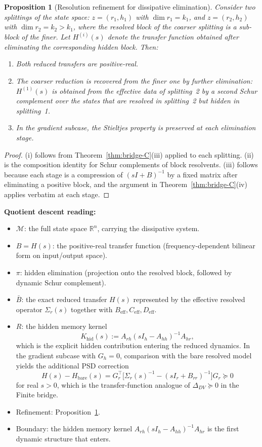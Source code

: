 \documentclass[11pt,a4paper]{article}
\numberwithin{equation}{section}
\newcommand{\R}{\mathbb{R}}
\theoremstyle{thmcompact}
\newtheorem{proposition}[theorem]{Proposition}
\theoremstyle{remark}
\begin{document}
\begin{proposition}[Resolution refinement for dissipative elimination]\label{prop:bridge-C-refine}
Consider two splittings of the state space: $z = (r_1, h_1)$ with $\dim r_1 = k_1$, and $z = (r_2, h_2)$ with $\dim r_2 = k_2 > k_1$, where the resolved block of the coarser splitting is a sub-block of the finer. Let $H^{(i)}(s)$ denote the transfer function obtained after eliminating the corresponding hidden block. Then:
\begin{enumerate}[label=\textup{(\roman*)}]
\item Both reduced transfers are positive-real.
\item The coarser reduction is recovered from the finer one by further elimination: $H^{(1)}(s)$ is obtained from the effective data of splitting~2 by a second Schur complement over the states that are resolved in splitting~2 but hidden in splitting~1.
\item In the gradient subcase, the Stieltjes property is preserved at each elimination stage.
\end{enumerate}
\end{proposition}

\begin{proof}
(i) follows from Theorem~\ref{thm:bridge-C}(iii) applied to each splitting. (ii) is the composition identity for Schur complements of block resolvents. (iii) follows because each stage is a compression of $(sI+B)^{-1}$ by a fixed matrix after eliminating a positive block, and the argument in Theorem~\ref{thm:bridge-C}(iv) applies verbatim at each stage.
\end{proof}

\textbf{Quotient descent reading:}
\begin{itemize}[leftmargin=2em]
\item $\mathcal{M}$: the full state space $\R^n$, carrying the dissipative system.
\item $B = H(s)$: the positive-real transfer function (frequency-dependent bilinear form on input/output space).
\item $\pi$: hidden elimination (projection onto the resolved block, followed by dynamic Schur complement).
\item $\bar{B}$: the exact reduced transfer $H(s)$ represented by the effective resolved operator $\Sigma_r(s)$ together with $B_{\mathrm{eff}}, C_{\mathrm{eff}}, D_{\mathrm{eff}}$.
\item $R$: the hidden memory kernel
\[
K_{\mathrm{hid}}(s):=A_{rh}(sI_h-A_{hh})^{-1}A_{hr},
\]
which is the explicit hidden contribution entering the reduced dynamics. In the gradient subcase with $G_h = 0$, comparison with the bare resolved model yields the additional PSD correction
\[
H(s) - H_{\mathrm{bare}}(s) = G_r^\top\bigl[\Sigma_r(s)^{-1} - (sI_r + B_{rr})^{-1}\bigr]G_r \succeq 0
\]
for real $s>0$, which is the transfer-function analogue of $\Delta_{DV} \succeq 0$ in the Finite bridge.
\item Refinement: Proposition~\ref{prop:bridge-C-refine}.
\item Boundary: the hidden memory kernel $A_{rh}(sI_h - A_{hh})^{-1}A_{hr}$ is the first dynamic structure that enters.
\end{itemize}
\end{document}
